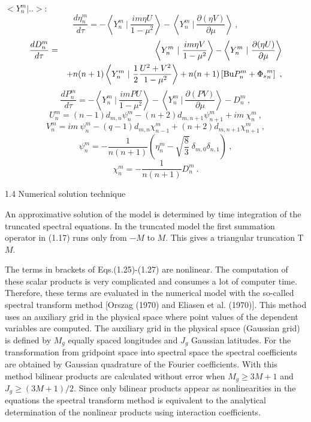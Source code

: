 $<Y^m_n|..>$:
{\setlength{\mathindent}{1em}
\begin{equation}
\frac {d \eta_n^m} {d\tau}=  -\left < Y^m_n ~|~   \frac {im\eta U} {1-\mu^2}\right > 
- \left < Y^m_n ~|~ \frac {\partial (\eta V)} {\partial \mu} \right >~,
\end{equation}
\begin{eqnarray}
\frac {d D_n^m} {d\tau} & = &   \left < Y^m_n ~|~  \frac {im \eta V} {1-\mu^2} \right >
- \left < Y^m_n ~|~ \frac {\partial (\eta U)} {\partial \mu} \right > \\ \nonumber
& & + n(n+1)
\left < Y^m_n ~|~ \frac 1  2 \frac  {U^2+V^2}  {1-\mu^2}  \right > + n(n+1) \left [ {\rm Bu} P_n^m + {\Phi_s}^m_n \right ]~,
\end{eqnarray}
\begin{equation}
\frac {d P_n^m} {d\tau}=  -\left < Y^m_n ~|~  \frac {im P U} {1-\mu^2} \right > 
- \left < Y^m_n ~|~ \frac {\partial (P V)} {\partial \mu} \right  > - D_n^m~,
\end{equation}
\begin{equation}
 U^m_n   =    (n - 1) d_{m,n}  \psi^m_n - (n+2) d_{m,n+1}  \psi^m_{n+1} + i m~ \chi^m_n~,
\end{equation}
\begin{equation}
  V^m_n  =   i m ~ \psi^m_n - (q - 1) d_{m,n}  \chi^m_{n-1}
  + (n+2) d_{m,n+1}  \chi^m_{n+1}~, 
\end{equation}
\begin{equation}
 \psi^m_n   =  - \frac 1 {n(n+1)} \left(\eta^m_n - \sqrt {\frac 8 3}~
 \delta_{m,0}\delta_{n,1}\right) ~, 
\end{equation}
\begin{equation}
 \chi^m_n   =  - \frac 1 {n(n+1)} D^m_n~.
\end{equation}
}

1.4 Numerical solution technique

\nopagebreak[4]

An approximative solution of the model is determined by 
time integration of the truncated spectral equations. In the truncated model
the first summation operator
in (1.17) runs only from $-M$ to $M$. This gives a triangular truncation
T$M$.

The terms in brackets of Eqs.(1.25)-(1.27) are nonlinear. The computation of these scalar products is very complicated and
consumes a lot of computer time.
Therefore, these terms are evaluated in the numerical model
 with the so-called spectral transform method [Orszag (1970)
and Eliasen et al. (1970)]. This method uses an auxiliary grid in the physical space where point values of the
dependent variables are computed. The auxiliary grid in the physical space ({\sc Gauss}ian grid) is defined
by $M_g$ equally spaced longitudes and $J_g$ {\sc Gauss}ian latitudes.
For the transformation from gridpoint space into spectral space the spectral coefficients are obtained by
{\sc Gauss}ian quadrature of the {\sc Fourier} coefficients. With this method bilinear products are
calculated without error when $M_g \ge 3M+1$ and $J_g \ge (3M+1)/2$. Since only bilinear products
appear as nonlinearities in the equations the spectral transform method is equivalent to the analytical
determination of the nonlinear products using interaction coefficients.

